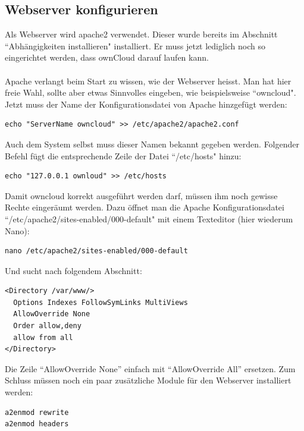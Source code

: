 \subsection{Webserver konfigurieren}
Als Webserver wird apache2 verwendet. Dieser wurde bereits im Abschnitt ``Abhängigkeiten installieren" installiert. Er muss jetzt lediglich noch so eingerichtet werden, dass ownCloud darauf laufen kann.
\\
\\
Apache verlangt beim Start zu wissen, wie der Webserver heisst. Man hat hier freie Wahl, sollte aber etwas Sinnvolles eingeben, wie beispielsweise ``owncloud".
\\
Jetzt muss der Name der Konfigurationsdatei von Apache hinzgefügt werden:

\begin{lstlisting}
echo "ServerName owncloud" >> /etc/apache2/apache2.conf
\end{lstlisting}

Auch dem System selbst muss dieser Namen bekannt gegeben werden. Folgender Befehl fügt die entsprechende Zeile der Datei ``/etc/hosts" hinzu:

\begin{lstlisting}
echo "127.0.0.1 ownloud" >> /etc/hosts
\end{lstlisting}

Damit owncloud korrekt ausgeführt werden darf, müssen ihm noch gewisse Rechte eingeräumt werden. Dazu öffnet man die Apache Konfigurationsdatei ``/etc/apache2/sites-enabled/000-default" mit einem Texteditor (hier wiederum Nano):

\begin{lstlisting}
nano /etc/apache2/sites-enabled/000-default
\end{lstlisting}

Und sucht nach folgendem Abschnitt:

\begin{lstlisting}
<Directory /var/www/>
  Options Indexes FollowSymLinks MultiViews
  AllowOverride None
  Order allow,deny
  allow from all
</Directory>
\end{lstlisting}

Die Zeile ``AllowOverride None'' einfach mit ``AllowOverride All'' ersetzen. Zum Schluss müssen noch ein paar zusätzliche Module für den Webserver installiert werden:

\begin{lstlisting}
a2enmod rewrite
a2enmod headers
\end{lstlisting}


